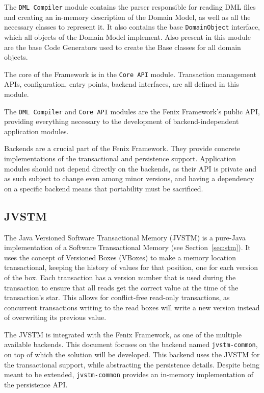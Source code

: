\documentclass{llncs}
\begin{document}
The \texttt{DML Compiler} module contains the parser responsible for reading
DML files and creating an in-memory description of the Domain Model,
as well as all the necessary classes to represent it. It also contains
the base \texttt{DomainObject} interface, which all objects of the Domain
Model implement. Also present in this module are the base Code
Generators used to create the Base classes for all domain
objects.

The core of the Framework is in the \texttt{Core API} module. Transaction
management APIs, configuration, entry points, backend interfaces, are
all defined in this module.

The \texttt{DML Compiler} and \texttt{Core API} modules are the Fenix
Framework's public API, providing everything necessary to the
development of backend-independent application modules.

Backends are a crucial part of the Fenix Framework. They provide
concrete implementations of the transactional and persistence
support. Application modules should not depend directly on the
backends, as their API is private and as such subject to change even
among minor versions, and having a dependency on a specific backend
means that portability must be sacrificed.

\subsection{JVSTM}
\label{sec:jvstm}

The Java Versioned Software Transactional Memory (JVSTM)
\cite{cachopo2006versioned} is a pure-Java implementation of a
Software Transactional Memory (see Section~\ref{sec:stm}).  It uses
the concept of Versioned Boxes (VBoxes) to make a memory location
transactional, keeping the history of values for that position, one
for each version of the box. Each transaction has a version number
that is used during the transaction to ensure that all reads get the
correct value at the time of the transaction's star. This allows for
conflict-free read-only transactions, as concurrent transactions
writing to the read boxes will write a new version instead of
overwriting its previous value.

The JVSTM is integrated with the Fenix Framework, as one of the
multiple available backends. This document focuses on the backend
named \texttt{jvstm-common}, on top of which the solution will be
developed. This backend uses the JVSTM for the transactional support,
while abstracting the persistence details. Despite being meant to be
extended, \texttt{jvstm-common} provides an in-memory implementation
of the persistence API.
\end{document}
